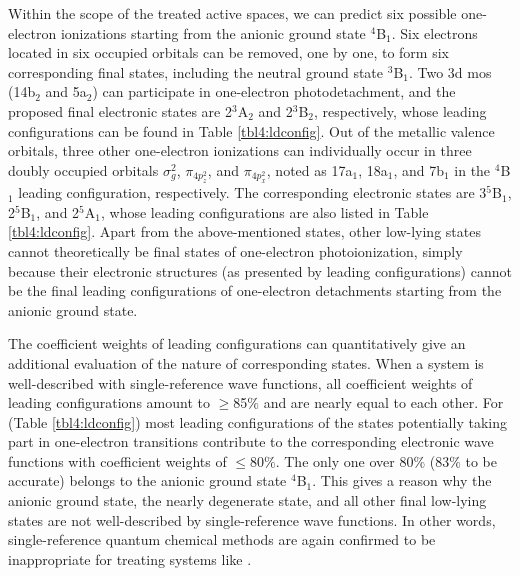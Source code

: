 \begin{refsection}
Within the scope of the treated active spaces, we can predict six possible one-electron ionizations starting from the anionic ground state $^4$B$_1$. Six electrons located in six occupied orbitals can be removed, one by one, to form six corresponding final states, including the neutral ground state $^3$B$_1$. Two 3d \acrshort{mo}s (14b$_2$ and 5a$_2$) can participate in one-electron photodetachment, and the proposed final electronic states are 2$^3$A$_2$ and 2$^3$B$_2$, respectively, whose leading configurations can be found in Table \ref{tbl4:ldconfig}. Out of the metallic valence orbitals, three other one-electron ionizations can individually occur in three doubly occupied orbitals $\sigma_g^2$, $\pi_{4p_z^2}$, and $\pi_{4p_x^2}$, noted as 17a$_1$, 18a$_1$, and 7b$_1$ in the $^4$B$_1$ leading configuration, respectively. The corresponding electronic states are 3$^5$B$_1$, 2$^5$B$_1$, and 2$^5$A$_1$, whose leading configurations are also listed in Table \ref{tbl4:ldconfig}. Apart from the above-mentioned states, other low-lying states cannot theoretically be final states of one-electron photoionization, simply because their electronic structures (as presented by leading configurations) cannot be the final leading configurations of one-electron detachments starting from the anionic ground state. 





The coefficient weights of leading configurations can quantitatively give an additional evaluation of the nature of corresponding states. When a system is well-described with single-reference wave functions, \cite{c4:37} all coefficient weights of leading configurations amount to $\geq$85$\%$ and are nearly equal to each other. For  (Table \ref{tbl4:ldconfig}) most leading configurations of the states potentially taking part in one-electron transitions contribute to the corresponding electronic wave functions with coefficient weights of $\leq$80$\%$. The only one over 80$\%$ (83$\%$ to be accurate) belongs to the anionic ground state $^4$B$_1$. This gives a reason why the anionic ground state, the nearly degenerate state, and all other final low-lying states are not well-described by single-reference wave functions. In other words, single-reference quantum chemical methods are again confirmed to be inappropriate for treating systems like .






\end{refsection}

